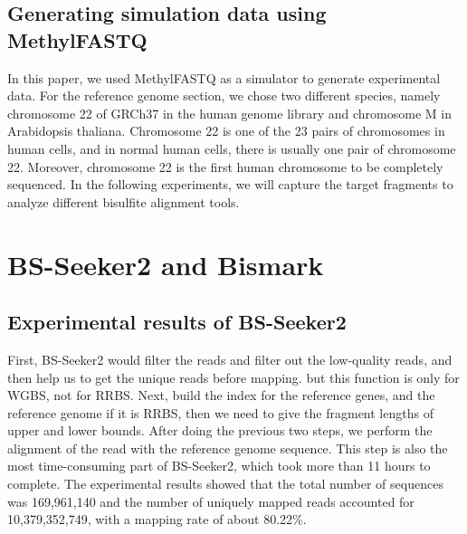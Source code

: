 \documentclass{PHlab-thesis}
\begin{document}
\subsection{Generating simulation data using MethylFASTQ}
In this paper, we used MethylFASTQ as a simulator to generate experimental data. For the reference genome section, we chose two different species, namely chromosome 22 of GRCh37 in the human genome library and chromosome M in Arabidopsis thaliana. Chromosome 22 is one of the 23 pairs of chromosomes in human cells, and in normal human cells, there is usually one pair of chromosome 22. Moreover, chromosome 22 is the first human chromosome to be completely sequenced. In the following experiments, we will capture the target fragments to analyze different bisulfite alignment tools.



\section{BS-Seeker2 and Bismark}
\subsection{Experimental results of BS-Seeker2}
First, BS-Seeker2 would filter the reads and filter out the low-quality reads, and then help us to get the unique reads before mapping. but this function is only for WGBS, not for RRBS. Next, build the index for the reference genes, and the reference genome if it is RRBS, then we need to give the fragment lengths of upper and lower bounds. After doing the previous two steps, we perform the alignment of the read with the reference genome sequence. This step is also the most time-consuming part of BS-Seeker2, which took more than 11 hours to complete. The experimental results showed that the total number of sequences was 169,961,140 and the number of uniquely mapped reads accounted for 10,379,352,749, with a mapping rate of about 80.22\%.
\end{document}
